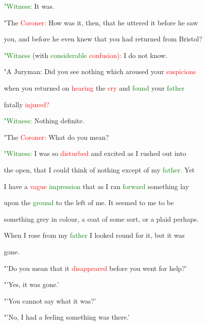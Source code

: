  \textcolor{green}{"Witness:} It was.



 "The \textcolor{red}{Coroner:} How was it, then, that he uttered it before he saw

 you, and before he even knew that you had returned from Bristol?



 \textcolor{green}{"Witness} (with \textcolor{green}{considerable} \textcolor{red}{confusion):} I do not know.



 "A Juryman: Did you see nothing which \textcolor{BurntOrange}{aroused} your \textcolor{red}{suspicions}

 when you returned on \textcolor{red}{hearing} the \textcolor{red}{cry} and \textcolor{green}{found} your \textcolor{green}{father}

 fatally \textcolor{red}{injured?}



 \textcolor{green}{"Witness:} Nothing definite.



 "The \textcolor{red}{Coroner:} What do you mean?



 \textcolor{green}{"Witness:} I was so \textcolor{red}{disturbed} and \textcolor{BurntOrange}{excited} as I rushed out into

 the open, that I could think of nothing except of my \textcolor{green}{father.} Yet

 I have a \textcolor{red}{vague} \textcolor{green}{impression} that as I ran \textcolor{green}{forward} something lay

 upon the \textcolor{green}{ground} to the left of me. It seemed to me to be

 something grey in colour, a coat of some sort, or a plaid perhaps.

 When I rose from my \textcolor{green}{father} I looked round for it, but it was

 gone.



 "'Do you mean that it \textcolor{red}{disappeared} before you went for help?'



 "'Yes, it was gone.'



 "'You cannot say what it was?'



 "'No, I had a feeling something was there.'



